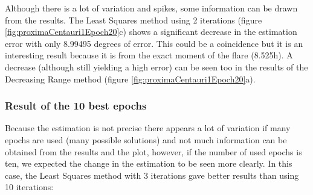 Although there is a lot of variation and spikes, some information can be drawn from the results. The Least Squares method using 2 iterations (figure \ref{fig:proximaCentauri1Epoch20}c) shows a significant decrease in the estimation error with only 8.99495 degrees of error. This could be a coincidence but it is an interesting result because it is from the exact moment of the flare (8.525h). A decrease (although still yielding a high error) can be seen too in the results of the Decreasing Range method (figure \ref{fig:proximaCentauri1Epoch20}a).

\clearpage

\subsubsection{Result of the 10 best epochs}

Because the estimation is not precise there appears a lot of variation if many epochs are used (many possible solutions) and not much information can be obtained from the results and the plot, however, if the number of used epochs is ten, we expected the change in the estimation to be seen more clearly. In this case, the Least Squares method with 3 iterations gave better results than using 10 iterations:

